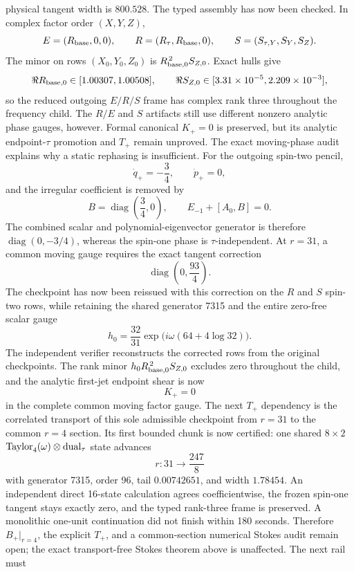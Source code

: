 \documentclass[11pt]{article}
\theoremstyle{definition}
\theoremstyle{remark}
\begin{document}
physical tangent width is \(800.528\).  The typed assembly has now been
checked.  In complex factor order \((X,Y,Z)\),
\[
 E=(R_{\rm base},0,0),\qquad
 R=(R_\tau,R_{\rm base},0),\qquad
 S=(S_{\tau,Y},S_Y,S_Z).
\]
The minor on rows \((X_0,Y_0,Z_0)\) is
\(R_{{\rm base},0}^{\,2}S_{Z,0}\).  Exact hulls give
\[
 \Re R_{{\rm base},0}\in[1.00307,1.00508],
 \qquad
 \Re S_{Z,0}\in[3.31\times10^{-5},2.209\times10^{-3}],
\]
so the reduced outgoing \(E/R/S\) frame has complex rank three throughout
the frequency child.  The \(R/E\) and \(S\) artifacts still use different
nonzero analytic phase gauges, however.  Formal canonical \(K_+=0\) is
preserved, but its analytic endpoint-\(\tau\) promotion and \(T_+\) remain
unproved.  The exact moving-phase audit explains why a static rephasing is
insufficient.  For the outgoing spin-two pencil,
\[
 \dot q_+=-\frac34,\qquad \dot p_+=0,
\]
and the irregular coefficient is removed by
\[
 B=\operatorname{diag}\!\left(\frac34,0\right),
 \qquad E_{-1}+[A_0,B]=0.
\]
The combined scalar and polynomial-eigenvector generator is therefore
\(\operatorname{diag}(0,-3/4)\), whereas the spin-one phase is
\(\tau\)-independent.  At \(r=31\), a common moving gauge requires the exact
tangent correction
\[
 \operatorname{diag}\!\left(0,\frac{93}{4}\right).
\]
The checkpoint has now been reissued with this correction on the \(R\) and
\(S\) spin-two rows, while retaining the shared generator 7315 and the
entire zero-free scalar gauge
\[
 h_0=\frac{32}{31}\exp\!\bigl(i\omega(64+4\log32)\bigr).
\]
The independent verifier reconstructs the corrected rows from the original
checkpoints.  The rank minor
\(h_0R_{{\rm base},0}^{\,2}S_{Z,0}\) excludes zero throughout the child, and
the analytic first-jet endpoint shear is now
\[
 K_+=0
\]
in the complete common moving factor gauge.  The next \(T_+\) dependency is
the correlated transport of this sole admissible checkpoint from \(r=31\)
to the common \(r=4\) section.  Its first bounded chunk is now certified:
one shared \(8\times2\)
\(\operatorname{Taylor}_4(\omega)\otimes{\rm dual}_\tau\) state advances
\[
 r:31\longrightarrow \frac{247}{8}
\]
with generator 7315, order 96, tail \(0.00742651\), and width \(1.78454\).
An independent direct 16-state calculation agrees coefficientwise, the
frozen spin-one tangent stays exactly zero, and the typed rank-three frame is
preserved.  A monolithic one-unit continuation did not finish within 180
seconds.  Therefore \(B_+|_{r=4}\), the explicit \(T_+\), and a
common-section numerical Stokes audit remain open; the exact
transport-free Stokes theorem above is unaffected.  The next rail must
\end{document}
